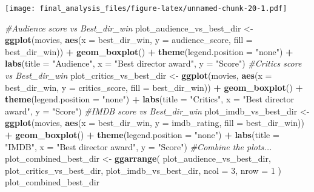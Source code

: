 \documentclass[]{article}
\newenvironment{Shaded}{\begin{snugshade}}{\end{snugshade}}
\newcommand{\CommentTok}[1]{\textcolor[rgb]{0.56,0.35,0.01}{\textit{#1}}}
\newcommand{\DataTypeTok}[1]{\textcolor[rgb]{0.13,0.29,0.53}{#1}}
\newcommand{\DecValTok}[1]{\textcolor[rgb]{0.00,0.00,0.81}{#1}}
\newcommand{\KeywordTok}[1]{\textcolor[rgb]{0.13,0.29,0.53}{\textbf{#1}}}
\newcommand{\NormalTok}[1]{#1}
\newcommand{\OperatorTok}[1]{\textcolor[rgb]{0.81,0.36,0.00}{\textbf{#1}}}
\newcommand{\StringTok}[1]{\textcolor[rgb]{0.31,0.60,0.02}{#1}}
\begin{document}
\texttt{[image: final\_analysis\_files/figure-latex/unnamed-chunk-20-1.pdf]}

\begin{Shaded}
\begin{Highlighting}[]
\CommentTok{#Audience score vs Best_dir_win}
\NormalTok{plot_audience_vs_best_dir <-}
\StringTok{  }\KeywordTok{ggplot}\NormalTok{(movies,}
         \KeywordTok{aes}\NormalTok{(}\DataTypeTok{x =}\NormalTok{ best_dir_win, }\DataTypeTok{y =}\NormalTok{ audience_score, }\DataTypeTok{fill =}\NormalTok{ best_dir_win)) }\OperatorTok{+}\StringTok{ }\KeywordTok{geom_boxplot}\NormalTok{() }\OperatorTok{+}\StringTok{ }\KeywordTok{theme}\NormalTok{(}\DataTypeTok{legend.position =} \StringTok{"none"}\NormalTok{) }\OperatorTok{+}\StringTok{ }\KeywordTok{labs}\NormalTok{(}\DataTypeTok{title =} \StringTok{"Audience"}\NormalTok{, }\DataTypeTok{x =} \StringTok{"Best director award"}\NormalTok{, }\DataTypeTok{y =} \StringTok{"Score"}\NormalTok{)}
\CommentTok{#Critics score vs Best_dir_win}
\NormalTok{plot_critics_vs_best_dir <-}
\StringTok{  }\KeywordTok{ggplot}\NormalTok{(movies,}
         \KeywordTok{aes}\NormalTok{(}\DataTypeTok{x =}\NormalTok{ best_dir_win, }\DataTypeTok{y =}\NormalTok{ critics_score, }\DataTypeTok{fill =}\NormalTok{ best_dir_win)) }\OperatorTok{+}\StringTok{ }\KeywordTok{geom_boxplot}\NormalTok{() }\OperatorTok{+}\StringTok{ }\KeywordTok{theme}\NormalTok{(}\DataTypeTok{legend.position =} \StringTok{"none"}\NormalTok{) }\OperatorTok{+}\StringTok{ }\KeywordTok{labs}\NormalTok{(}\DataTypeTok{title =} \StringTok{"Critics"}\NormalTok{, }\DataTypeTok{x =} \StringTok{"Best director award"}\NormalTok{, }\DataTypeTok{y =} \StringTok{"Score"}\NormalTok{)}
\CommentTok{#IMDB score vs Best_dir_win}
\NormalTok{plot_imdb_vs_best_dir <-}
\StringTok{  }\KeywordTok{ggplot}\NormalTok{(movies, }\KeywordTok{aes}\NormalTok{(}\DataTypeTok{x =}\NormalTok{ best_dir_win, }\DataTypeTok{y =}\NormalTok{ imdb_rating, }\DataTypeTok{fill =}\NormalTok{ best_dir_win)) }\OperatorTok{+}
\StringTok{  }\KeywordTok{geom_boxplot}\NormalTok{() }\OperatorTok{+}\StringTok{ }\KeywordTok{theme}\NormalTok{(}\DataTypeTok{legend.position =} \StringTok{"none"}\NormalTok{) }\OperatorTok{+}\StringTok{ }\KeywordTok{labs}\NormalTok{(}\DataTypeTok{title =} \StringTok{"IMDB"}\NormalTok{, }\DataTypeTok{x =} \StringTok{"Best director award"}\NormalTok{, }\DataTypeTok{y =} \StringTok{"Score"}\NormalTok{)}
\CommentTok{#Combine the plots...}
\NormalTok{plot_combined_best_dir <-}
\StringTok{  }\KeywordTok{ggarrange}\NormalTok{(}
\NormalTok{    plot_audience_vs_best_dir,}
\NormalTok{    plot_critics_vs_best_dir,}
\NormalTok{    plot_imdb_vs_best_dir,}
    \DataTypeTok{ncol =} \DecValTok{3}\NormalTok{,}
    \DataTypeTok{nrow =} \DecValTok{1}
\NormalTok{  )}
\NormalTok{plot_combined_best_dir}
\end{Highlighting}
\end{Shaded}
\end{document}
